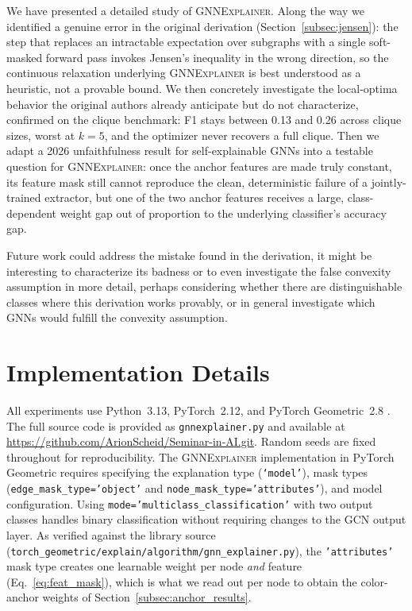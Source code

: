 \documentclass{article}
\newcommand{\GNNEx}{\textsc{GNNExplainer}\xspace}
\theoremstyle{definition}
\begin{document}
We have presented a detailed study of \GNNEx. Along the way we identified a
genuine error in the original derivation (Section~\ref{subsec:jensen}): the
step that replaces an intractable expectation over subgraphs with a single
soft-masked forward pass invokes Jensen's inequality in the wrong
direction, so the continuous relaxation underlying \GNNEx is best
understood as a heuristic, not a provable bound. We then concretely investigate the local-optima behavior the
original authors already anticipate but do not characterize, confirmed on
the clique benchmark: F1 stays between 0.13 and 0.26 across clique sizes,
worst at $k=5$, and the optimizer never recovers a full clique. Then we adapt a 2026 unfaithfulness result for
self-explainable GNNs into a testable question for \GNNEx: once the anchor
features are made truly constant, its feature mask still cannot reproduce
the clean, deterministic failure of a jointly-trained extractor, but one of
the two anchor features receives a large, class-dependent weight gap out of
proportion to the underlying classifier's accuracy gap.

Future work could address the mistake found in the derivation, it might be
interesting to characterize its badness or to even investigate the false 
convexity assumption in more detail, perhaps considering
whether there are distinguishable classes where this derivation works provably,
or in general investigate which GNNs would fulfill the convexity assumption.




\appendix

\section{Implementation Details}
\label{app:impl}

All experiments use Python~3.13, PyTorch~2.12, and PyTorch Geometric~2.8
\citep{fey2019fast}. The full source code is provided as
\texttt{gnnexplainer.py} and available at
\url{https://github.com/ArionScheid/Seminar-in-AI.git}. Random seeds are
fixed throughout for reproducibility. The \GNNEx implementation in PyTorch Geometric requires
specifying the explanation type (\texttt{`model'}), mask types
(\texttt{edge\_mask\_type='object'} and \texttt{node\_mask\_type='attributes'}),
and model configuration. Using \texttt{mode='multiclass\_classification'} with
two output classes handles binary classification without requiring changes to the
GCN output layer. As verified against the library source
(\texttt{torch\_geometric/explain/algorithm/gnn\_explainer.py}), the
\texttt{'attributes'} mask type creates one learnable weight per node \emph{and}
feature (Eq.~\ref{eq:feat_mask}), which is what we read out per node to obtain
the color-anchor weights of Section~\ref{subsec:anchor_results}.
\end{document}
